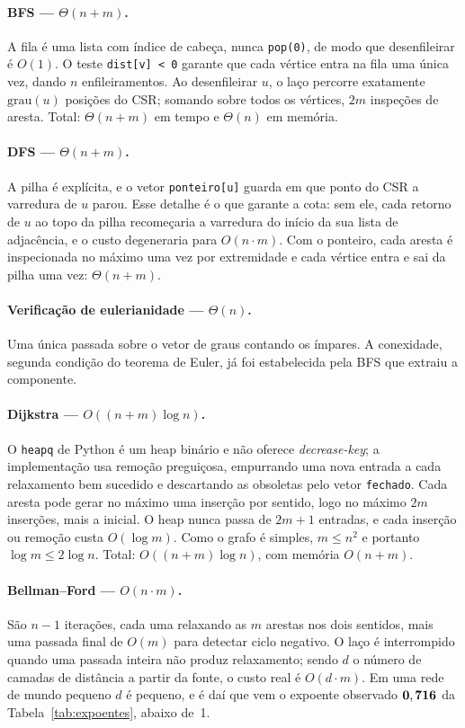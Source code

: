 \documentclass[sigconf]{webmedia}
\begin{document}
\paragraph{BFS --- $\Theta(n+m)$.} A fila é uma lista com índice de
cabeça, nunca \texttt{pop(0)}, de modo que desenfileirar é $O(1)$. O teste
\texttt{dist[v] < 0} garante que cada vértice entra na fila uma única vez,
dando $n$ enfileiramentos. Ao desenfileirar $u$, o laço percorre
exatamente $\mathrm{grau}(u)$ posições do CSR; somando sobre todos os
vértices, $2m$ inspeções de aresta. Total: $\Theta(n+m)$ em tempo e
$\Theta(n)$ em memória.

\paragraph{DFS --- $\Theta(n+m)$.} A pilha é explícita, e o vetor
\texttt{ponteiro[u]} guarda em que ponto do CSR a varredura de $u$ parou.
Esse detalhe é o que garante a cota: sem ele, cada retorno de $u$ ao topo
da pilha recomeçaria a varredura do início da sua lista de adjacência, e
o custo degeneraria para $O(n\cdot m)$. Com o ponteiro, cada aresta é
inspecionada no máximo uma vez por extremidade e cada vértice entra e sai
da pilha uma vez: $\Theta(n+m)$.

\paragraph{Verificação de eulerianidade --- $\Theta(n)$.} Uma única
passada sobre o vetor de graus contando os ímpares. A conexidade, segunda
condição do teorema de Euler, já foi estabelecida pela BFS que extraiu a
componente.

\paragraph{Dijkstra --- $O((n+m)\log n)$.} O \texttt{heapq} de Python é um
heap binário e não oferece \textit{decrease-key}; a implementação usa
remoção preguiçosa, empurrando uma nova entrada a cada relaxamento bem
sucedido e descartando as obsoletas pelo vetor \texttt{fechado}. Cada
aresta pode gerar no máximo uma inserção por sentido, logo no máximo $2m$
inserções, mais a inicial. O heap nunca passa de $2m+1$ entradas, e cada
inserção ou remoção custa $O(\log m)$. Como o grafo é simples,
$m \leq n^2$ e portanto $\log m \leq 2\log n$. Total:
$O((n+m)\log n)$, com memória $O(n+m)$.

\paragraph{Bellman--Ford --- $O(n\cdot m)$.} São $n-1$ iterações, cada uma
relaxando as $m$ arestas nos dois sentidos, mais uma passada final de
$O(m)$ para detectar ciclo negativo. O laço é interrompido quando uma
passada inteira não produz relaxamento; sendo $d$ o número de camadas de
distância a partir da fonte, o custo real é $O(d\cdot m)$. Em uma rede de
mundo pequeno $d$ é pequeno, e é daí que vem o expoente observado
$\mathbf{0,716}$ da Tabela~\ref{tab:expoentes}, abaixo de~1.
\end{document}
